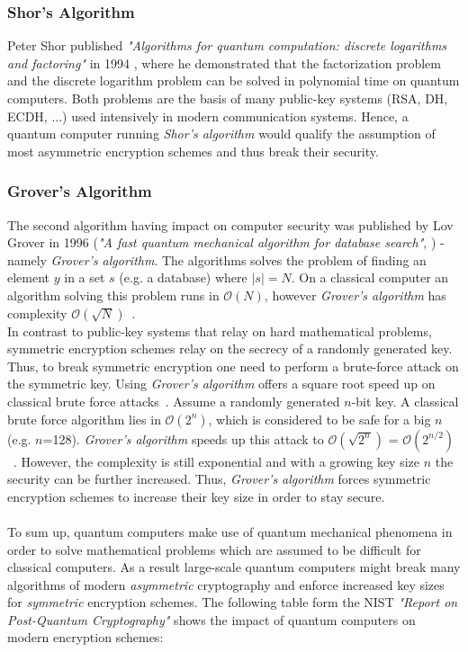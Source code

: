 \subsubsection{Shor's Algorithm}
Peter Shor published \textit{"Algorithms for quantum computation: discrete logarithms and factoring"} in 1994 \parencite{shor1994algorithms}, where he demonstrated that the factorization problem and the discrete logarithm problem can be solved in polynomial time on quantum computers. Both problems are the basis of many public-key systems (RSA, DH, ECDH, ...) used intensively in modern communication systems. Hence, a quantum computer running \textit{Shor's algorithm} would qualify the assumption of most asymmetric encryption schemes and thus break their security.


\subsubsection{Grover's Algorithm}
The second algorithm having impact on computer security was published by Lov Grover in 1996 (\textit{"A fast quantum mechanical algorithm for database search"}, \parencite{grover1996fast}) - namely \textit{Grover's algorithm}. The algorithms solves the problem of finding an element $y$ in a set $s$ (e.g. a database) where $|s| = N$. On a classical computer an algorithm solving this problem runs in $\mathcal{O}(N)$, however \textit{Grover's algorithm} has complexity $\mathcal{O}(\sqrt{N})$~\parencite{nielsen2002quantum}.\\
In contrast to public-key systems that relay on hard mathematical problems, symmetric encryption schemes relay on the secrecy of a randomly generated key. 
Thus, to break symmetric encryption one need to perform a brute-force attack on the symmetric key. Using \textit{Grover's algorithm} offers a square root speed up on classical brute force attacks~\parencite{mavroeidis2018impact}. Assume a randomly generated $n$-bit key. A classical brute force algorithm lies in $\mathcal{O}(2^n)$, which is considered to be safe for a big $n$ (e.g. $n$=128). \textit{Grover's algorithm} speeds up this attack to $\mathcal{O}(\sqrt{2^n})$ = $\mathcal{O}(2^{n/2})$~\parencite{mavroeidis2018impact}. However, the complexity is still exponential and with a growing key size $n$ the security can be further increased. Thus, \textit{Grover's algorithm} forces symmetric encryption schemes to increase their key size in order to stay secure.
\\\\
To sum up, quantum computers make use of quantum mechanical phenomena in order to solve mathematical problems which are assumed to be difficult for classical computers. As a result large-scale quantum computers might break many algorithms of modern \textit{asymmetric} cryptography and enforce increased key sizes for \textit{symmetric} encryption schemes. The following table form the NIST \textit{"Report on Post-Quantum Cryptography"} \parencite{chen2016report} shows the impact of quantum computers on modern encryption schemes:


